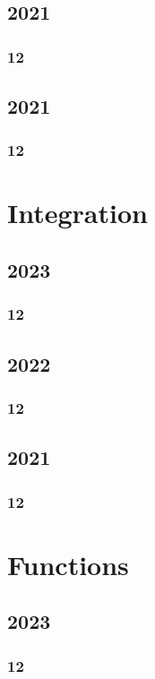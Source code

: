 \documentclass[11pt]{book}
\begin{document}
\section{2021}
\subsection{12}

\section{2021}
\subsection{12}



\chapter{Integration}
\section{2023}
\subsection{12}

\section{2022}
\subsection{12}


\section{2021}
\subsection{12}



\chapter{Functions}
\section{2023}
\subsection{12}

\end{document}
